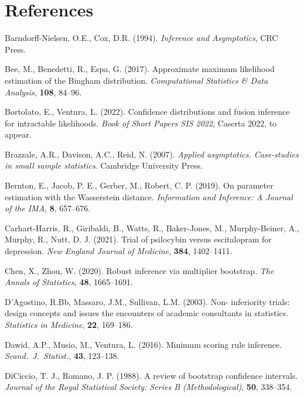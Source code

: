 \documentclass[preprint,12pt,authoryear]{elsarticle}
\begin{document}

\section*{References}

\begin{description}
\item
Barndorff-Nielsen, O.E., Cox, D.R. (1994). {\em Inference and Asymptotics}, CRC Press.
\item
Bee, M., Benedetti, R., Espa, G. (2017). Approximate maximum likelihood estimation of the Bingham distribution. {\em Computational Statistics \& Data Analysis}, {\bf  108}, 84--96.
\item 
Bortolato, E., Ventura, L. (2022). Confidence distributions and fusion inference for intractable likelihoods. {\em Book of Short Papers SIS 2022}, Caserta 2022, to appear.
\item
Brazzale, A.R., Davison, A.C., Reid, N. (2007). {\em  Applied asymptotics. Case-studies in small sample statistics}. Cambridge University Press.
\item Bernton, E., Jacob, P. E., Gerber, M.,  Robert, C. P. (2019). On parameter estimation with the Wasserstein distance. {\em Information and Inference: A Journal of the IMA}, {\bf 8}, 657--676.
\item
Carhart-Harris, R., Giribaldi, B., Watts, R., Baker-Jones, M., Murphy-Beiner, A., Murphy, R.,  Nutt, D. J. (2021). Trial of psilocybin versus escitalopram for depression. {\em New England Journal of Medicine}, {\bf 384}, 1402--1411.
\item
Chen, X., Zhou,  W. (2020).  { Robust inference via multiplier bootstrap}. {\em The Annals of Statistics}, {\bf 48}, 1665--1691.
\item
D'Agostino, R.Bb, Massaro, J.M., Sullivan, L.M. (2003). Non- inferiority trials: design concepts and issues the encounters of academic consultants in statistics. {\em Statistics in Medicine}, {\bf 22}, 169--186.
\item
Dawid, A.P., Musio, M., Ventura, L. (2016). Minimum scoring rule inference. {\em Scand.\ J.\ 
Statist.}, {\bf 43}, 123--138.
 \item
DiCiccio, T. J.,  Romano, J. P. (1988). A review of bootstrap confidence intervals. {\em Journal of the Royal Statistical Society: Series B (Methodological)}, {\bf 50}, 338--354.
\item

\end{description}
\end{document}
